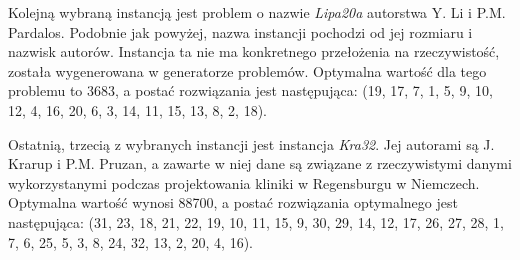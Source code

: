 Kolejną wybraną instancją jest problem o nazwie \textit{Lipa20a} autorstwa Y. Li i P.M. Pardalos. Podobnie jak powyżej, nazwa instancji pochodzi od jej rozmiaru i nazwisk autorów. Instancja ta nie ma konkretnego przełożenia na rzeczywistość, została wygenerowana w generatorze problemów. Optymalna wartość dla tego problemu to 3683, a postać rozwiązania jest następująca:
\newline
(19, 17, 7, 1, 5, 9, 10, 12, 4, 16, 20, 6, 3, 14, 11, 15, 13, 8, 2, 18).

Ostatnią, trzecią z wybranych instancji jest instancja \textit{Kra32}. Jej autorami są J. Krarup i P.M. Pruzan, a zawarte w niej dane są związane z rzeczywistymi danymi wykorzystanymi podczas projektowania kliniki w Regensburgu w Niemczech. Optymalna wartość wynosi 88700, a postać rozwiązania optymalnego jest następująca:
\newline
(31, 23, 18, 21, 22, 19, 10, 11, 15, 9, 30, 29, 14, 12, 17, 26, 27, 28, 1, 7, 6, 25, 5, 3, 8, 24, 32, 13, 2, 20, 4, 16).    
 
